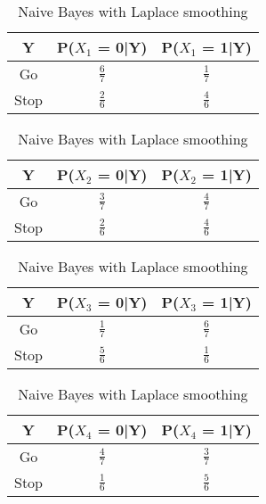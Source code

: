 \documentclass[en]{university}
\begin{document}
\begin{table}
\centering
\begin{tabular}{|c|c|c|}
    \hline
    Y & P($X_1$ = 0|Y) & P($X_1$ = 1|Y) \\
    \hline
    Go & $\frac{6}{7}$ & $\frac{1}{7}$ \\
    \hline
    Stop & $\frac{2}{6}$ & $\frac{4}{6}$ \\
    \hline
\end{tabular}
\centering
\begin{tabular}{|c|c|c|}
    \hline
    Y & P($X_2$ = 0|Y) & P($X_2$ = 1|Y) \\
    \hline
    Go & $\frac{3}{7}$ & $\frac{4}{7}$ \\
    \hline
    Stop & $\frac{2}{6}$ & $\frac{4}{6}$ \\
    \hline
\end{tabular}
\centering
\begin{tabular}{|c|c|c|}
    \hline
    Y & P($X_3$ = 0|Y) & P($X_3$ = 1|Y) \\
    \hline
    Go & $\frac{1}{7}$ & $\frac{6}{7}$ \\
    \hline
    Stop & $\frac{5}{6}$ & $\frac{1}{6}$ \\
    \hline
\end{tabular}
\centering
\begin{tabular}{|c|c|c|}
    \hline
    Y & P($X_4$ = 0|Y) & P($X_4$ = 1|Y) \\
    \hline
    Go & $\frac{4}{7}$ & $\frac{3}{7}$ \\
    \hline
    Stop & $\frac{1}{6}$ & $\frac{5}{6}$ \\ 
    \hline
\end{tabular}
\caption{Naive Bayes with Laplace smoothing}
\label{tab:naivebayes-laplace}
\end{table}
\end{document}
